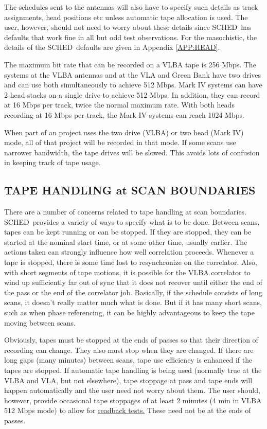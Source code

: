 \documentclass{report}
\newcommand{\schedb}{{\sc SCHED~}}
\begin{document}
The schedules sent to the antennas will also have to specify such
details as track assignments, head positions etc unless automatic
tape allocation is used.  The user, however, should not need to
worry about these details since \schedb has defaults that work fine
in all but odd test observations.  For the masochistic, the details
of the \schedb defaults are given in Appendix \ref{APP:HEAD}.

The maximum bit rate that can be recorded on a VLBA tape is 256 Mbps.
The systems at the VLBA antennas and at the VLA and Green Bank have
two drives and can use both simultaneously to achieve 512 Mbps.
Mark IV systems can have 2 head stacks on a single drive to achieve
512 Mbps.  In addition, they can record at 16 Mbps per track, twice
the normal maximum rate.  With both heads recording at 16 Mbps per
track, the Mark IV systems can reach 1024 Mbps.

When part of an project uses the two drive (VLBA) or two head
(Mark IV) mode, all of that project will be recorded in that mode.
If some scans use narrower bandwidth, the tape drives will be slowed.
This avoids lots of confusion in keeping track of tape usage.

\subsection{\label{SSSEC:TAPESCAN}TAPE HANDLING at SCAN BOUNDARIES}

There are a number of concerns related to tape handling at scan
boundaries.  \schedb provides a variety of ways to specify what is
to be done.  Between scans, tapes can be kept running or can be
stopped.  If they are stopped, they can be started at the nominal
start time, or at some other time, usually earlier.  The actions
taken can strongly influence how well correlation proceeds.  Whenever
a tape is stopped, there is some time lost to resynchronize on
the correlator.  Also, with short segments of tape motions, it is
possible for the VLBA correlator to wind up sufficiently far out
of sync that it does not recover until either the end of the pass
or the end of the correlator job.  Basically, if the schedule consists
of long scans, it doesn't really matter much what is done.  But if
it has many short scans, such as when phase referencing, it can be
highly advantageous to keep the tape moving between scans.

Obviously, tapes must be stopped at the ends of passes so that their
direction of recording can change.  They also must stop when they are
changed.  If there are long gaps (many minutes) between scans, tape
use efficiency is enhanced if the tapes are stopped.  If automatic
tape handling is being used (normally true at the VLBA and VLA, but
not elsewhere), tape stoppage at pass and tape ends will happen
automatically and the user need not worry about them.  The user
should, however, provide occasional tape stoppages of at least 2
minutes (4 min in VLBA 512 Mbps mode) to allow for 
{\hyperref[SSSEC:READBACK]{readback tests.}}
These need not be at the ends of passes.
\end{document}
